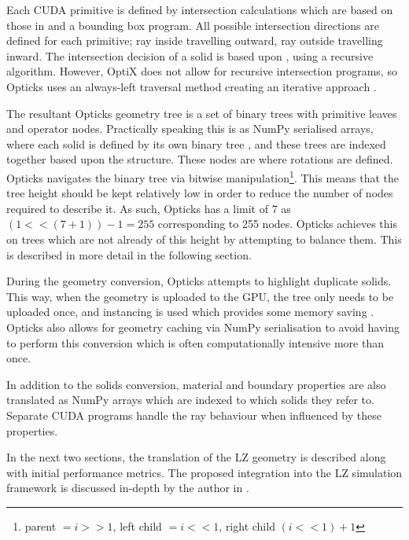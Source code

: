 Each CUDA primitive is defined by intersection calculations which are based on those in \cite{real_time_collision_detection_ref} and a bounding box program.
All possible intersection directions are defined for each primitive; ray inside travelling outward, ray outside travelling inward.
The intersection decision of a solid is based upon \cite{CSG_Intersection_ref}, using a recursive algorithm.
However, OptiX does not allow for recursive intersection programs, so Opticks uses an always-left traversal method creating an iterative approach \cite{Opticks_Paper_2017_ref}.
\par
The resultant Opticks geometry tree is a set of binary trees with primitive leaves and operator nodes.
Practically speaking this is as NumPy serialised arrays, where each solid is defined by its own binary tree \cite{Opticks_Paper_2017_ref}, and these trees are indexed together based upon the structure.
These nodes are where rotations are defined.
Opticks navigates the binary tree via bitwise manipulation\footnote{parent $=i >> 1$, left child $= i << 1$, right child $(i<<1)+1$}.
This means that the tree height should be kept relatively low in order to reduce the number of nodes required to describe it.
As such, Opticks has a limit of 7 as $(1 << (7 + 1)) - 1 = 255$ corresponding to 255 nodes.
Opticks achieves this on trees which are not already of this height by attempting to balance them.
This is described in more detail in the following section.
\par
During the geometry conversion, Opticks attempts to highlight duplicate solids.
This way, when the geometry is uploaded to the GPU, the tree only needs to be uploaded once, and instancing is used which provides some memory saving \cite{Opticks_CHEP_2019_ref}.
Opticks also allows for geometry caching via NumPy serialisation \cite{Opticks_Paper_2017_ref} to avoid having to perform this conversion which is often computationally intensive more than once.
\par
In addition to the solids conversion, material and boundary properties are also translated as NumPy arrays which are indexed to which solids they refer to.
Separate CUDA programs handle the ray behaviour when influenced by these properties.

\par
In the next two sections, the translation of the LZ geometry is described along with initial performance metrics.
The proposed integration into the LZ simulation framework is discussed in-depth by the author in \cite{SEriksen_Opticks_CHEP_2021_ref}.

